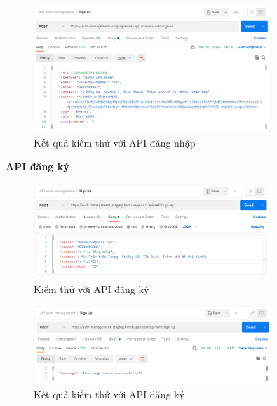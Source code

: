 		\begin{figure}[!ht]
			\includegraphics[width=0.8\textwidth]{Images/testing/API-sign-in-result.png}
			\centering
			\linebreak
			\caption{Kết quả kiểm thử với API đăng nhập}
		\end{figure}
		
		\newpage	
		
		\textbf{API đăng ký}
		
		\begin{figure}[!ht]
			\includegraphics[width=0.8\textwidth]{Images/testing/API-sign-up.png}
			\centering
			\linebreak
			\caption{Kiểm thử với API đăng ký}
		\end{figure}
		
		\begin{figure}[!ht]
			\includegraphics[width=0.8\textwidth]{Images/testing/API-sign-up-result.png}
			\centering
			\linebreak
			\caption{Kết quả kiểm thử với API đăng ký}
		\end{figure}
		
		\newpage
		
